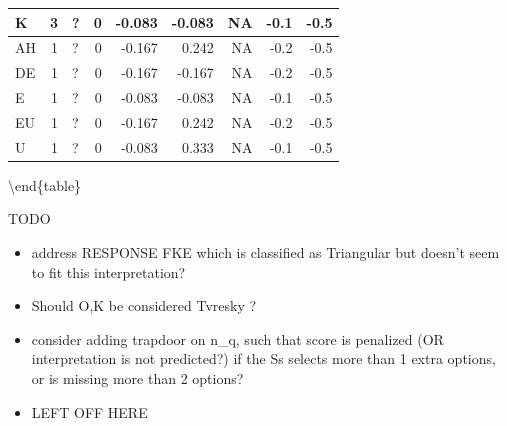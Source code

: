 \documentclass[
  letterpaper,
  DIV=11,
  numbers=noendperiod]{scrreprt}
\providecommand{\tightlist}{%
  \setlength{\itemsep}{0pt}\setlength{\parskip}{0pt}}\usepackage{longtable,booktabs,array}
\begin{document}
\begin{tabular}[t]{l|r|l|r|r|r|r|r|r}
\hline
\hspace{1em}K & 3 & ? & 0 & -0.083 & -0.083 & NA & -0.1 & -0.5\\
\hline
\hspace{1em}AH & 1 & ? & 0 & -0.167 & 0.242 & NA & -0.2 & -0.5\\
\hline
\hspace{1em}DE & 1 & ? & 0 & -0.167 & -0.167 & NA & -0.2 & -0.5\\
\hline
\hspace{1em}E & 1 & ? & 0 & -0.083 & -0.083 & NA & -0.1 & -0.5\\
\hline
\hspace{1em}EU & 1 & ? & 0 & -0.167 & 0.242 & NA & -0.2 & -0.5\\
\hline
\hspace{1em}U & 1 & ? & 0 & -0.083 & 0.333 & NA & -0.1 & -0.5\\
\hline
\end{tabular}

\textbackslash end\{table\}

TODO

\begin{itemize}
\tightlist
\item
  address RESPONSE FKE which is classified as Triangular but doesn't
  seem to fit this interpretation?
\item
  Should O,K be considered Tvresky ?
\item
  consider adding trapdoor on n\_q, such that score is penalized (OR
  interpretation is not predicted?) if the Ss selects more than 1 extra
  options, or is missing more than 2 options?
\item
  LEFT OFF HERE
\end{itemize}
\end{document}
